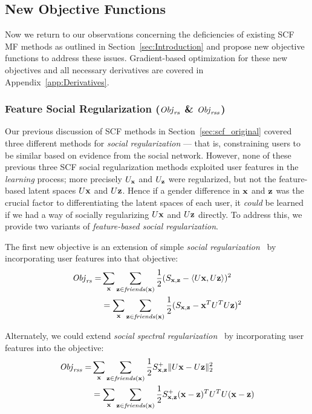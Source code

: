 \subsection{New Objective Functions}

\label{sec:newobjfun_defs}

Now we return to our observations concerning the deficiencies of
existing SCF MF methods as outlined in Section~\ref{sec:Introduction}
and propose new objective functions to address these issues.
Gradient-based optimization for these new objectives and all necessary
derivatives are covered in Appendix~\ref{app:Derivatives}.

\subsubsection{Feature Social Regularization ($\mathit{Obj}_{\mathit{rs}}$ \& $\mathit{Obj}_{\mathit{rss}}$)}
\label{sec:SocRec}

Our previous discussion of SCF methods in Section~\ref{sec:scf_original}
covered three different methods for \emph{social regularization} --- that is,
constraining users to be similar based on evidence from the social network.
However, none of these previous three SCF social regularization methods
exploited user features in the \emph{learning} process; more precisely 
$U_{\mathbf{x}}$ and $U_{\mathbf{z}}$ were regularized, but not the feature-based latent
spaces $U\mathbf{x}$ and $U\mathbf{z}$.  Hence if a gender difference in $\mathbf{x}$ and $\mathbf{z}$ was the
crucial factor to differentiating the latent spaces of each user, it \emph{could} 
be learned if we had a way of socially regularizing $U\mathbf{x}$ and $U\mathbf{z}$
directly.  To address this, we provide two variants of 
\emph{feature-based social regularization}.

The first new objective is an extension of simple 
\emph{social regularization}~\cite{lla,socinf} by incorporating user
features into that objective:
\begin{align}
\mathit{Obj}_{\mathit{rs}} = & \sum_{\mathbf{x}} \sum_{\mathbf{z} \in \mathit{friends}(\mathbf{x})} \frac{1}{2} (S_{\mathbf{x},\mathbf{z}} - \langle U\mathbf{x}, U\mathbf{z} \rangle)^2 \\
& = \sum_{\mathbf{x}} \sum_{\mathbf{z} \in \mathit{friends}(\mathbf{x})} \frac{1}{2} (S_{\mathbf{x},\mathbf{z}} - \mathbf{x}^T U^T U \mathbf{z})^2 \nonumber 
\end{align}


Alternately, we could extend \emph{social spectral
regularization}~\cite{sr,rrmf} by incorporating user features into the
objective:
\begin{align}
\mathit{Obj}_{\mathit{rss}} = & \sum_{\mathbf{x}} \sum_{\mathbf{z} \in \mathit{friends}(\mathbf{x})} \frac{1}{2} S^+_{\mathbf{x},\mathbf{z}} \| U\mathbf{x} - U\mathbf{z} \|_2^2 \\
& = \sum_{\mathbf{x}} \sum_{\mathbf{z} \in \mathit{friends}(\mathbf{x})} \frac{1}{2} S^+_{\mathbf{x},\mathbf{z}} (\mathbf{x} - \mathbf{z})^T U^T U (\mathbf{x} - \mathbf{z}) \nonumber
\end{align}

